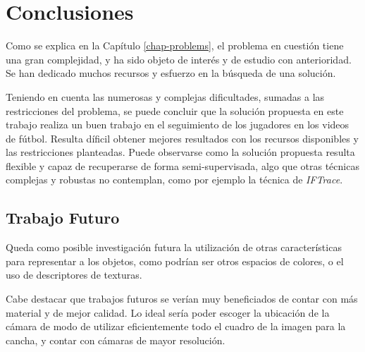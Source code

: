 \chapter{Conclusiones}
\label{chap-conclusion}

Como se explica en la Capítulo \ref{chap-problems}, el problema en cuestión
tiene una gran complejidad, y ha sido objeto de interés y de estudio con
anterioridad. Se han dedicado muchos recursos y esfuerzo en la búsqueda de una
solución.

Teniendo en cuenta las numerosas y complejas dificultades, sumadas a las
restricciones del problema, se puede concluir que la solución propuesta en este
trabajo realiza un buen trabajo en el seguimiento de los jugadores en los
videos de fútbol. Resulta díficil obtener mejores resultados con los recursos
disponibles y las restricciones planteadas. Puede observarse como la solución
propuesta resulta flexible y capaz de recuperarse de forma semi-supervisada,
algo que otras técnicas complejas y robustas no contemplan, como por ejemplo la
técnica de \textit{IFTrace}.


\section{Trabajo Futuro}

Queda como posible investigación futura la utilización de otras características
para representar a los objetos, como podrían ser otros espacios de colores, o
el uso de descriptores de texturas.

Cabe destacar que trabajos futuros se verían muy beneficiados de contar con más
material y de mejor calidad. Lo ideal sería poder escoger la ubicación de la
cámara de modo de utilizar eficientemente todo el cuadro de la imagen para la
cancha, y contar con cámaras de mayor resolución.


